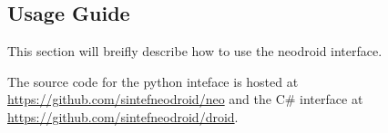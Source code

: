 \subsection{Usage Guide}

This section will breifly describe how to use the neodroid interface.

The source code for the python inteface is hosted at \url{https://github.com/sintefneodroid/neo} and the C\# interface at \url{https://github.com/sintefneodroid/droid}.